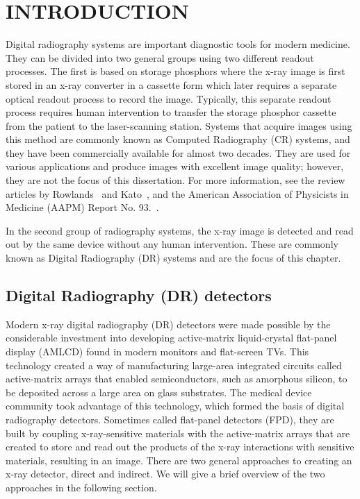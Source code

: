\chapter{INTRODUCTION}
\label{chap:intro}
Digital radiography systems are important diagnostic tools for modern medicine.  They can be divided into two general groups using two different readout processes.  The first is based on storage phosphors where the x-ray image is first stored in an x-ray converter in a cassette form which later requires a separate optical readout process to record the image.  Typically, this separate readout process requires human intervention to transfer the storage phosphor cassette from the patient to the laser-scanning station.  Systems that acquire images using this method are commonly known as Computed Radiography (CR) systems, and they have been commercially available for almost two decades.  They are used for various applications and produce images with excellent image quality; however, they are not the focus of this dissertation.  For more information, see the review articles by Rowlands~\citep{Rowlands2002} and Kato~\citep{kato1994}, and the American Association of Physicists in Medicine (AAPM) Report No. 93.~\citep{AAPM93}.  

In the second group of radiography systems, the x-ray image is detected and read out by the same device without any human intervention.  These are commonly known as Digital Radiography (DR) systems and are the focus of this chapter.

\section{Digital Radiography (DR) detectors}
Modern x-ray digital radiography (DR) detectors were made possible by the considerable investment into developing active-matrix liquid-crystal flat-panel display (AMLCD) found in modern monitors and flat-screen TVs.  This technology created a way of manufacturing large-area integrated circuits called active-matrix arrays that enabled semiconductors, such as amorphous silicon, to be deposited across a large area on glass substrates.  The medical device community took advantage of this technology, which formed the basis of digital radiography detectors.  Sometimes called flat-panel detectors (FPD), they are built by coupling x-ray-sensitive materials with the active-matrix arrays that are created to store and read out the products of the x-ray interactions with sensitive materials, resulting in an image.  There are two general approaches to creating an x-ray detector, direct and indirect.  We will give a brief overview of the two approaches in the following section.

